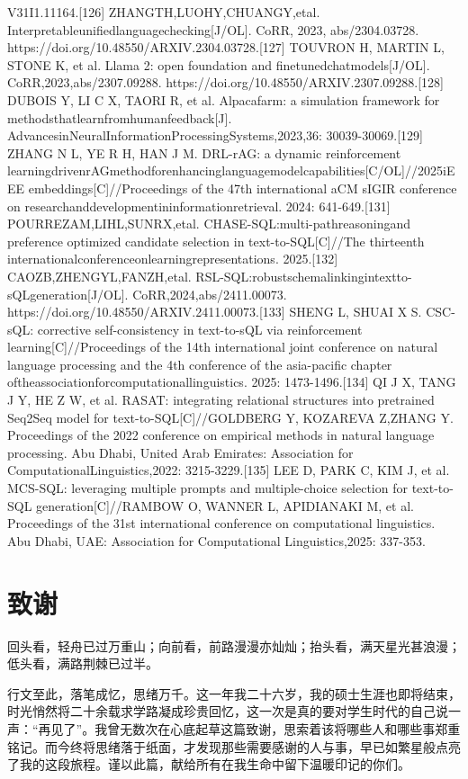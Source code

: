 \documentclass[12pt,a4paper,openright,UTF8]{ctexbook}
\begin{document}
V31I1.11164.[126] ZHANGTH,LUOHY,CHUANGY,etal. Interpretableunifiedlanguagechecking[J/OL]. CoRR, 2023, abs/2304.03728. https://doi.org/10.48550/ARXIV.2304.03728.[127] TOUVRON H, MARTIN L, STONE K, et al. Llama 2: open foundation and finetunedchatmodels[J/OL]. CoRR,2023,abs/2307.09288. https://doi.org/10.48550/ARXIV.2307.09288.[128] DUBOIS Y, LI C X, TAORI R, et al. Alpacafarm: a simulation framework for methodsthatlearnfromhumanfeedback[J]. AdvancesinNeuralInformationProcessingSystems,2023,36: 30039-30069.[129] ZHANG N L, YE R H, HAN J M. DRL-rAG: a dynamic reinforcement learningdrivenrAGmethodforenhancinglanguagemodelcapabilities[C/OL]//2025iEEE embeddings[C]//Proceedings of the 47th international aCM sIGIR conference on researchanddevelopmentininformationretrieval. 2024: 641-649.[131] POURREZAM,LIHL,SUNRX,etal. CHASE-SQL:multi-pathreasoningand preference optimized candidate selection in text-to-SQL[C]//The thirteenth internationalconferenceonlearningrepresentations. 2025.[132] CAOZB,ZHENGYL,FANZH,etal. RSL-SQL:robustschemalinkingintextto-sQLgeneration[J/OL]. CoRR,2024,abs/2411.00073. https://doi.org/10.48550/ARXIV.2411.00073.[133] SHENG L, SHUAI X S. CSC-sQL: corrective self-consistency in text-to-sQL via reinforcement learning[C]//Proceedings of the 14th international joint conference on natural language processing and the 4th conference of the asia-pacific chapter oftheassociationforcomputationallinguistics. 2025: 1473-1496.[134] QI J X, TANG J Y, HE Z W, et al. RASAT: integrating relational structures into pretrained Seq2Seq model for text-to-SQL[C]//GOLDBERG Y, KOZAREVA Z,ZHANG Y. Proceedings of the 2022 conference on empirical methods in natural language processing. Abu Dhabi, United Arab Emirates: Association for ComputationalLinguistics,2022: 3215-3229.[135] LEE D, PARK C, KIM J, et al. MCS-SQL: leveraging multiple prompts and multiple-choice selection for text-to-SQL generation[C]//RAMBOW O, WANNER L, APIDIANAKI M, et al. Proceedings of the 31st international conference on computational linguistics. Abu Dhabi, UAE: Association for Computational Linguistics,2025: 337-353.

\chapter*{致\quad 谢}

回头看，轻舟已过万重山；向前看，前路漫漫亦灿灿；抬头看，满天星光甚浪漫；低头看，满路荆棘已过半。


行文至此，落笔成忆，思绪万千。这一年我二十六岁，我的硕士生涯也即将结束，时光悄然将二十余载求学路凝成珍贵回忆，这一次是真的要对学生时代的自己说一声：“再见了”。我曾无数次在心底起草这篇致谢，思索着该将哪些人和哪些事郑重铭记。而今终将思绪落于纸面，才发现那些需要感谢的人与事，早已如繁星般点亮了我的这段旅程。谨以此篇，献给所有在我生命中留下温暖印记的你们。
\end{document}
